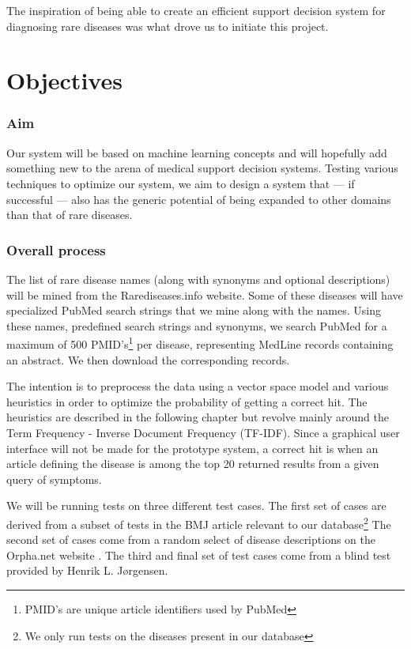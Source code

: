 The inspiration of being able to create an efficient support decision
system for diagnosing rare diseases was what drove us to initiate this
project.

\section{Objectives}

\subsubsection{Aim}
Our system will be based on machine learning concepts and will
hopefully add something new to the arena of medical support decision
systems. Testing various techniques to optimize our system, we aim to
design a system that --- if successful --- also has the generic potential of
being expanded to other domains than that of rare diseases.

\subsubsection{Overall process}
The list of rare disease names (along with synonyms and optional
descriptions) will be mined from the Rarediseases.info website. Some
of these diseases will have specialized PubMed search strings that we
mine along with the names. Using these names, predefined search
strings and synonyms, we search PubMed for a maximum of 500
PMID's\footnote{PMID's are unique article identifiers used by PubMed}
per disease, representing MedLine records containing an abstract. We
then download the corresponding records.

The intention is to preprocess the data using a vector space model and
various heuristics in order to optimize the probability of getting a correct
hit. The heuristics are described in the following chapter but
revolve mainly around the Term Frequency - Inverse Document Frequency
(TF-IDF). Since a graphical user interface will not be made for the
prototype system, a correct hit is when an article defining the disease
is among the top 20 returned results from a given query of
symptoms.

We will be running tests on three different test cases. The first set
of cases are derived from a subset of tests in the BMJ article
\cite{HangwiTang11102006} relevant to our database\footnote{We only
  run tests on the diseases present in our database} The second set of
cases come from a random select of disease descriptions on the
Orpha.net website \cite{Orphanet}. The third and final set of test
cases come from a blind test provided by Henrik L. J\o rgensen.

